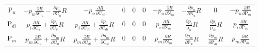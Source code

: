 \documentclass[12pt, a4paper]{article}
\begin{document}
\begin{table}[hb]
{\begin{tabular}{ c | ccccccccc }
  P$_u$      &
  $-p_u\frac{\partial R}{\partial \text{C}_u} - \frac{\partial p_u}{\partial \text{C}_u} R$  & 
  $-p_u\frac{\partial R}{\partial \text{C}_{di}}$ & 
  0 &
  0 &
  0 &
  $-p_u\frac{\partial R}{\partial \text{N}_m}$ &
  $-\frac{\partial p_u}{\partial \text{N}_u} R$ &
  0&
  $-p_u\frac{\partial R}{\partial \text{P}_m}$ \\

  P$_{di}$    &
  $p_i\frac{\partial R}{\partial \text{C}_u} + \frac{\partial p_i}{\partial \text{C}_u}R$  & 
  $p_i\frac{\partial R}{\partial \text{C}_{di}} + \frac{\partial p_i}{\partial \text{C}_{di}}R$  & 
  0 & 
  0 &
  0&
  $p_i\frac{\partial R}{\partial \text{N}_m}$& 
  $\frac{\partial p_i}{\text{p}_{u}} R$   & 
  $\frac{\partial p_i}{\text{p}_{di}} R$  & 
  $p_i \frac{\partial R}{\partial \text{P}_m}$\\
  
  P$_m$    &
  $p_m \frac{\partial R}{\partial \text{C}_u} + \frac{\partial p_m}{\partial \text{C}_u} R$  & 
  $p_m\frac{\partial R}{\partial \text{C}_{di}} + \frac{\partial p_m}{\partial \text{C}_{di}} R$  & 
  0 &
  0 &
  0& 
  $p_m\frac{\partial R}{\partial \text{N}_m} $ & 
  $\frac{\partial p_m}{\partial \text{P}_u} R$   & 
  $\frac{\partial p_m}{\partial \text{P}_{di}} R$ & 
  $p_m\frac{\partial R}{\partial \text{P}_m} $ \\
  \end{tabular}
  }
\end{table}
\end{document}
